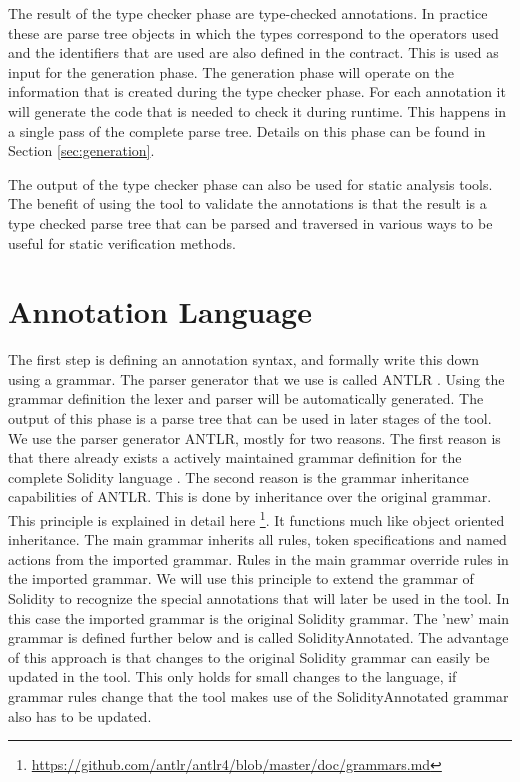 \documentclass[a4paper]{article}
\begin{document}
The result of the type checker phase are type-checked annotations. In practice these are parse tree objects in which the types correspond to the operators used and the identifiers that are used are also defined in the contract. This is used as input for the generation phase. The generation phase will operate on the information that is created during the type checker phase. For each annotation it will generate the code that is needed to check it during runtime. This happens in a single pass of the complete parse tree. Details on this phase can be found in Section \ref{sec:generation}. \par
The output of the type checker phase can also be used for static analysis tools. The benefit of using the tool to validate the annotations is that the result is a type checked parse tree that can be parsed and traversed in various ways to be useful for static verification methods. 

\newpage
\section{Annotation Language}
\label{sec:annotationlanguage}
The first step is defining an annotation syntax, and formally write this down using a grammar. The parser generator that we use is called ANTLR \cite{parr2013definitive}. Using the grammar definition the lexer and parser will be automatically generated. The output of this phase is a parse tree that can be used in later stages of the tool. We use the parser generator ANTLR, mostly for two reasons. The first reason is that there already exists a actively maintained grammar definition for the complete Solidity language \cite{antlroriginalgrammar}. The second reason is the grammar inheritance capabilities of ANTLR. This is done by inheritance over the original grammar. This principle is explained in detail here \footnote{\url{https://github.com/antlr/antlr4/blob/master/doc/grammars.md}}. It functions much like object oriented inheritance. The main grammar inherits all rules, token specifications and named actions from the imported grammar. Rules in the main grammar override rules in the imported grammar. We will use this principle to extend the grammar of Solidity to recognize the special annotations that will later be used in the tool. In this case the imported grammar is the original Solidity grammar. The 'new' main grammar is defined further below and is called SolidityAnnotated. The advantage of this approach is that changes to the original Solidity grammar can easily be updated in the tool. This only holds for small changes to the language, if grammar rules change that the tool makes use of the SolidityAnnotated grammar also has to be updated.
\end{document}
